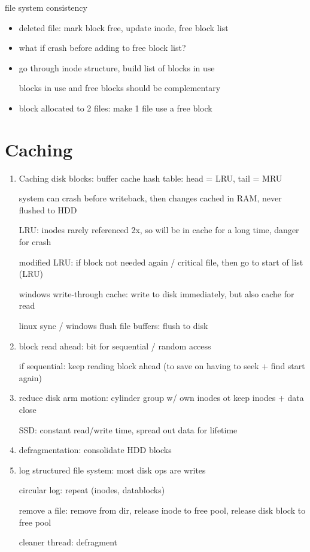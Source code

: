 \documentclass[11pt]{article}
\begin{document}
file system consistency
\begin{itemize}
    \item deleted file: mark block free, update inode, free block list
    \item what if crash before adding to free block list?
    \item go through inode structure, build list of blocks in use

        blocks in use and free blocks should be complementary

    \item block allocated to 2 files: make 1 file use a free block
\end{itemize}


\section{Caching}
\begin{enumerate}
    \item Caching disk blocks: buffer cache hash table: head = LRU, tail = MRU

        system can crash before writeback, then changes cached in RAM, never flushed to HDD

        LRU: inodes rarely referenced 2x, so will be in cache for a long time, danger for crash

        modified LRU: if block not needed again / critical file, then go to start of list (LRU)

        windows write-through cache: write to disk immediately, but also cache for read

        linux sync / windows flush file buffers: flush to disk

    \item block read ahead: bit for sequential / random access

        if sequential: keep reading block ahead (to save on having to seek + find start again)

    \item reduce disk arm motion: cylinder group w/ own inodes ot keep inodes + data close

        SSD: constant read/write time, spread out data for lifetime

    \item defragmentation: consolidate HDD blocks

    \item log structured file system: most disk ops are writes

        circular log: repeat (inodes, datablocks)

        remove a file: remove from dir, release inode to free pool, release disk block to free pool

        cleaner thread: defragment
\end{enumerate}
\end{document}
